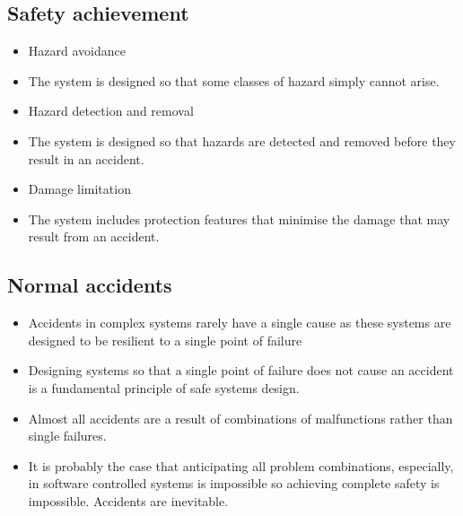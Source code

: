 \subsection{Safety achievement}
\begin{itemize}
\item Hazard avoidance

  \item The system is designed so that some classes of hazard simply cannot arise.

\item Hazard detection and removal

  \item The system is designed so that hazards are detected and removed before they result in an accident.

\item Damage limitation

  \item The system includes protection features that minimise the damage that may result from an accident.

\end{itemize}
\subsection{Normal accidents}
\begin{itemize}
\item Accidents in complex systems rarely have a single cause as these systems are designed to be resilient to a single point of failure

  \item Designing systems so that a single point of failure does not cause an accident is a fundamental principle of safe systems design.

\item Almost all accidents are a result of combinations of malfunctions rather than single failures.

\item It is probably the case that anticipating all problem combinations, especially, in software controlled systems is impossible so achieving complete safety is impossible. Accidents are inevitable.

\end{itemize}
